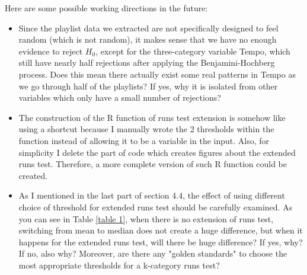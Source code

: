 \documentclass[12pt]{article}
\theoremstyle{plain}
\theoremstyle{definition}
\theoremstyle{remark}
\begin{document}
Here are some possible working directions in the future:
\begin{itemize}
    \item Since the playlist data we extracted are not specifically designed to feel random (which is not random), it makes sense that we have no enough evidence to reject $H_0$, except for the three-category variable Tempo, which still have nearly half rejections after applying the Benjamini-Hochberg process. Does this mean there actually exist some real patterns in Tempo as we go through half of the playlists? If yes, why it is isolated from other variables which only have a small number of rejections?
    \item The construction of the R function of runs test extension is somehow like using a shortcut because I manually wrote the 2 thresholds within the function instead of allowing it to be a variable in the input. Also, for simplicity I delete the part of code which creates figures about the extended runs test. Therefore, a more complete version of such R function could be created.
    \item As I mentioned in the last part of section 4.4, the effect of using different choice of threshold for extended runs test should be carefully examined. As you can see in Table \ref{table 1}, when there is no extension of runs test, switching from mean to median does not create a huge difference, but when it happens for the extended runs test, will there be huge difference? If yes, why? If no, also why? Moreover, are there any "golden standards" to choose the most appropriate thresholds for a k-category runs test? 
\end{itemize}

































\newpage
\printbibliography[heading=bibintoc,title={References}]
\newpage
\end{document}
